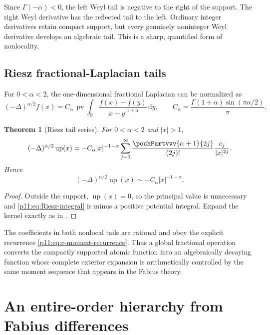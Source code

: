 \documentclass[11pt,oneside]{article}
\newtheorem{theorem}{Theorem}[section]
\theoremstyle{definition}
\theoremstyle{remark}
\newcommand{\Up}{\operatorname{up}}
\newcommand{\R}{\mathbb R}
\newcommand{\dd}{\,\mathrm d}
\newcommand{\1}{\mathbf 1}
\begin{document}
Since $\Gamma(-\alpha)<0$, the left Weyl tail is negative to the right of the
support.  The right Weyl derivative has the reflected tail to the left.
Ordinary integer derivatives retain compact support, but every genuinely
noninteger Weyl derivative develops an algebraic tail.  This is a sharp,
quantified form of nonlocality.

\subsection{Riesz fractional-Laplacian tails}

For $0<\alpha<2$, the one-dimensional fractional Laplacian can be normalized
as
\begin{equation}
 (-\Delta)^{\alpha/2}f(x)
 =C_\alpha\,\operatorname{pv}
  \int_{\R}\frac{f(x)-f(y)}{|x-y|^{1+\alpha}}\dd y,
 \qquad
 C_\alpha=\frac{\Gamma(1+\alpha)\sin(\pi\alpha/2)}{\pi}.
 \label{p11:eq:Riesz-integral}
\end{equation}

\begin{theorem}[Riesz tail series]
For $0<\alpha<2$ and $|x|>1$,
\begin{equation}
 (-\Delta)^{\alpha/2}\Up(x)
 =-C_\alpha|x|^{-1-\alpha}
  \sum_{j=0}^{\infty}
  \frac{\pochPartvvv{\alpha+1}{2j}}{(2j)!}
  \frac{c_j}{|x|^{2j}}.
 \label{p11:eq:Riesz-tail-series}
\end{equation}
Hence
\begin{equation}
 (-\Delta)^{\alpha/2}\Up(x)
 \sim-C_\alpha|x|^{-1-\alpha}.
 \label{p11:eq:Riesz-leading-tail}
\end{equation}
\end{theorem}

\begin{proof}
Outside the support, $\Up(x)=0$, so the principal value is unnecessary and
\eqref{p11:eq:Riesz-integral} is minus a positive potential integral.  Expand the
kernel exactly as in .
\end{proof}

The coefficients in both nonlocal tails are rational and obey the explicit
recurrence \eqref{p11:eq:c-moment-recurrence}.  Thus a global fractional
operation converts the compactly supported atomic function into an
algebraically decaying function whose complete exterior expansion is
arithmetically controlled by the same moment sequence that appears in the
Fabius theory.

\section{An entire-order hierarchy from Fabius differences}
\label{p11:sec:difference-hierarchy}
\end{document}
